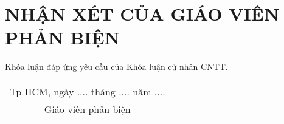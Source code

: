 \chapter*{NHẬN XÉT CỦA GIÁO VIÊN PHẢN BIỆN}

Khóa luận đáp ứng yêu cầu của Khóa luận cử nhân CNTT.\\
\begin{flushright}
\begin{tabular}{@{}c@{}}
Tp HCM, ngày .... tháng .... năm ....\\
Giáo viên phản biện\\
\end{tabular}
\end{flushright}